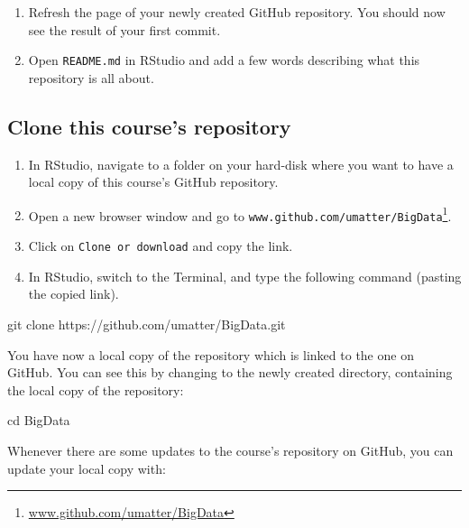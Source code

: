 \documentclass[
  12pt,
]{style/krantz}
\newenvironment{Shaded}{\begin{snugshade}}{\end{snugshade}}
\newcommand{\BuiltInTok}[1]{#1}
\newcommand{\FunctionTok}[1]{\textcolor[rgb]{0.00,0.00,0.00}{#1}}
\newcommand{\NormalTok}[1]{#1}
\providecommand{\tightlist}{%
  \setlength{\itemsep}{0pt}\setlength{\parskip}{0pt}}
\renewcommand{\href}[2]{#2\footnote{\url{#1}}}
\begin{document}
\begin{enumerate}
\def\labelenumi{\arabic{enumi}.}
\setcounter{enumi}{4}
\tightlist
\item
  Refresh the page of your newly created GitHub repository. You should now see the result of your first commit.
\item
  Open \texttt{README.md} in RStudio and add a few words describing what this repository is all about.
\end{enumerate}

\hypertarget{clone-this-courses-repository}{%
\subsection{Clone this course's repository}\label{clone-this-courses-repository}}

\begin{enumerate}
\def\labelenumi{\arabic{enumi}.}
\tightlist
\item
  In RStudio, navigate to a folder on your hard-disk where you want to have a local copy of this course's GitHub repository.
\item
  Open a new browser window and go to \href{www.github.com/umatter/BigData}{\texttt{www.github.com/umatter/BigData}}.
\item
  Click on \texttt{Clone\ or\ download} and copy the link.
\item
  In RStudio, switch to the Terminal, and type the following command (pasting the copied link).
\end{enumerate}

\begin{Shaded}
\begin{Highlighting}[]
\FunctionTok{git}\NormalTok{ clone https://github.com/umatter/BigData.git}
\end{Highlighting}
\end{Shaded}

You have now a local copy of the repository which is linked to the one on GitHub. You can see this by changing to the newly created directory, containing the local copy of the repository:

\begin{Shaded}
\begin{Highlighting}[]
\BuiltInTok{cd}\NormalTok{ BigData}
\end{Highlighting}
\end{Shaded}

Whenever there are some updates to the course's repository on GitHub, you can update your local copy with:
\end{document}
